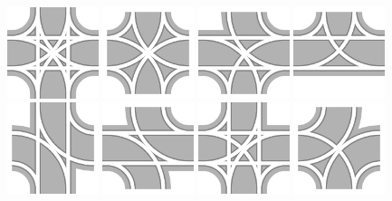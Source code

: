 \documentclass[12pt, letterpaper]{article}
\begin{document}
\includegraphics[width=0.20\textwidth]{Track_0.png}
\includegraphics[width=0.20\textwidth]{Track_3.png}
\includegraphics[width=0.20\textwidth]{Track_10.png}
\includegraphics[width=0.20\textwidth]{Track_22.png}
\includegraphics[width=0.20\textwidth]{Track_25.png}
\includegraphics[width=0.20\textwidth]{Track_26.png}
\includegraphics[width=0.20\textwidth]{Track_32.png}
\includegraphics[width=0.20\textwidth]{Track_35.png}
\end{document}
